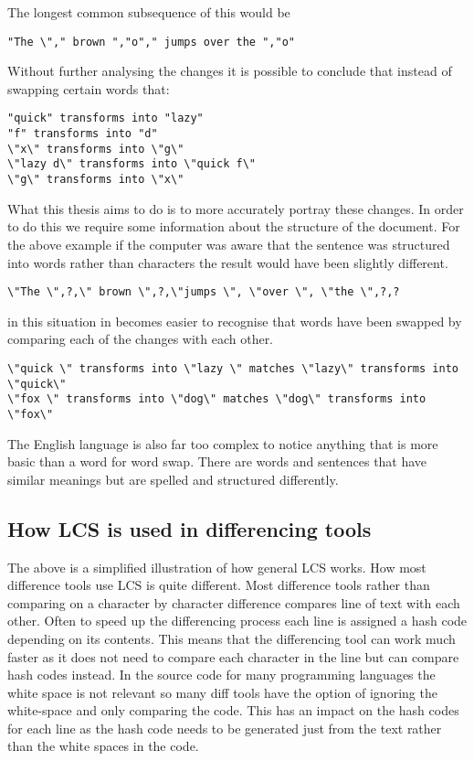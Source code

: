 The longest common subsequence of this would be

\begin{verbatim}
"The \"," brown ","o"," jumps over the ","o"
\end{verbatim}

Without further analysing the changes it is possible to conclude that instead of swapping certain words that:

\begin{verbatim}
"quick" transforms into "lazy"
"f" transforms into "d"
\"x\" transforms into \"g\"
\"lazy d\" transforms into \"quick f\"
\"g\" transforms into \"x\"
\end{verbatim}

What this thesis aims to do is to more accurately portray these changes.
In order to do this we require some information about the structure of the document.
For the above example if the computer was aware that the sentence was structured into words rather than characters the result would have been slightly different.

\begin{verbatim}
\"The \",?,\" brown \",?,\"jumps \", \"over \", \"the \",?,?
\end{verbatim}

in this situation in becomes easier to recognise that words have been swapped by comparing each of the changes with each other.  

\begin{verbatim}
\"quick \" transforms into \"lazy \" matches \"lazy\" transforms into \"quick\"
\"fox \" transforms into \"dog\" matches \"dog\" transforms into \"fox\" 
\end{verbatim}

The English language is also far too complex to notice anything that is more basic than a word for word swap.
There are words and sentences that have similar meanings but are spelled and structured differently.

\subsection{How LCS is used in differencing tools}
The above is a simplified illustration of how general LCS works.
How most difference tools use LCS is quite different.
Most difference tools rather than comparing on a character by character difference compares line of text with each other.
Often to speed up the differencing process each line is assigned a hash code depending on its contents. 
This means that the differencing tool can work much faster as it does not need to compare each character in the line but can compare hash codes instead.
In the source code for many programming languages the white space is not relevant so many diff tools have the option of ignoring the white-space and only comparing the code.
This has an impact on the hash codes for each line as the hash code needs to be generated just from the text rather than the white spaces in the code.
% 
 
